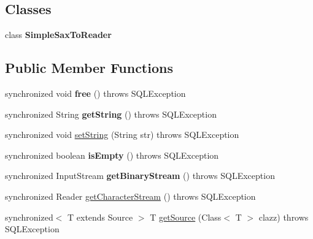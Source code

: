 \subsection*{Classes}
\begin{DoxyCompactItemize}
\item 
class {\bfseries Simple\+Sax\+To\+Reader}
\end{DoxyCompactItemize}
\subsection*{Public Member Functions}
\begin{DoxyCompactItemize}
\item 
\mbox{\label{classcom_1_1mysql_1_1jdbc_1_1_j_d_b_c4_mysql_s_q_l_x_m_l_a03d1f54d3523b1a1b85889b89311b9a5}} 
synchronized void {\bfseries free} ()  throws S\+Q\+L\+Exception 
\item 
\mbox{\label{classcom_1_1mysql_1_1jdbc_1_1_j_d_b_c4_mysql_s_q_l_x_m_l_a140874ed75b0019b9226fd676d2eb608}} 
synchronized String {\bfseries get\+String} ()  throws S\+Q\+L\+Exception 
\item 
synchronized void \mbox{\hyperlink{classcom_1_1mysql_1_1jdbc_1_1_j_d_b_c4_mysql_s_q_l_x_m_l_a7d7e5eb51cdc1ba0ba7529ccf5ee177f}{set\+String}} (String str)  throws S\+Q\+L\+Exception 
\item 
\mbox{\label{classcom_1_1mysql_1_1jdbc_1_1_j_d_b_c4_mysql_s_q_l_x_m_l_a31aa6d7fb07c09e3744d51ac73c8acf3}} 
synchronized boolean {\bfseries is\+Empty} ()  throws S\+Q\+L\+Exception 
\item 
\mbox{\label{classcom_1_1mysql_1_1jdbc_1_1_j_d_b_c4_mysql_s_q_l_x_m_l_ac46b00175e5065ea83adcc5360a73592}} 
synchronized Input\+Stream {\bfseries get\+Binary\+Stream} ()  throws S\+Q\+L\+Exception 
\item 
synchronized Reader \mbox{\hyperlink{classcom_1_1mysql_1_1jdbc_1_1_j_d_b_c4_mysql_s_q_l_x_m_l_a5010a4a2deacccf75de0f11dc242be21}{get\+Character\+Stream}} ()  throws S\+Q\+L\+Exception 
\item 
synchronized$<$ T extends Source $>$ T \mbox{\hyperlink{classcom_1_1mysql_1_1jdbc_1_1_j_d_b_c4_mysql_s_q_l_x_m_l_a8f48a3067f353a720f99b3dee481c522}{get\+Source}} (Class$<$ T $>$ clazz)  throws S\+Q\+L\+Exception 

\end{DoxyCompactItemize}
